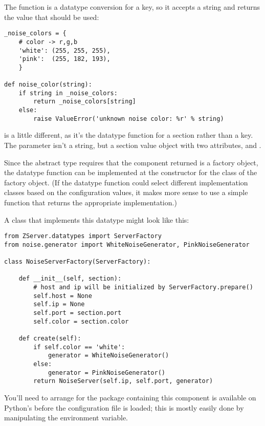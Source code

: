\documentclass{howto}
\newcommand{\datatype}[1]{\strong{#1}}
\begin{document}
The  function is a datatype conversion for a
key, so it accepts a string and returns the value that should be used:

\begin{verbatim}
_noise_colors = {
    # color -> r,g,b
    'white': (255, 255, 255),
    'pink':  (255, 182, 193),
    }

def noise_color(string):
    if string in _noise_colors:
        return _noise_colors[string]
    else:
        raise ValueError('unknown noise color: %r' % string)
\end{verbatim}

 is a little different, as it's the datatype
function for a section rather than a key.  The parameter isn't a
string, but a section value object with two attributes, 
and .

Since the \datatype{ZServer.server} abstract type requires that the
component returned is a factory object, the datatype function can be
implemented at the constructor for the class of the factory object.
(If the datatype function could select different implementation
classes based on the configuration values, it makes more sense to use
a simple function that returns the appropriate implementation.)

A class that implements this datatype might look like this:

\begin{verbatim}
from ZServer.datatypes import ServerFactory
from noise.generator import WhiteNoiseGenerator, PinkNoiseGenerator

class NoiseServerFactory(ServerFactory):

    def __init__(self, section):
        # host and ip will be initialized by ServerFactory.prepare()
        self.host = None
        self.ip = None
        self.port = section.port
        self.color = section.color

    def create(self):
        if self.color == 'white':
            generator = WhiteNoiseGenerator()
        else:
            generator = PinkNoiseGenerator()
        return NoiseServer(self.ip, self.port, generator)
\end{verbatim}

You'll need to arrange for the package containing this component is
available on Python's  before the configuration file is
loaded; this is mostly easily done by manipulating the
 environment variable.
\end{document}
